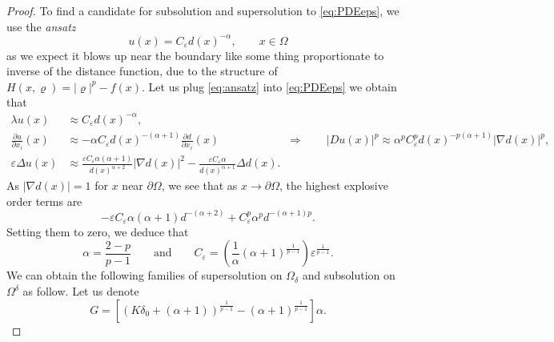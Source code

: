 \documentclass[11pt,reqno]{amsart}
\numberwithin{figure}{section}
\theoremstyle{plain}
\theoremstyle{remark}
\numberwithin{equation}{section}
\begin{document}
\begin{proof} 

\noindent To find a candidate for subsolution and supersolution to \eqref{eq:PDEeps}, we use the \emph{ansatz}
\begin{equation}\label{eq:ansatz}
    u(x) = C_\varepsilon d(x)^{-\alpha}, \qquad x\in \Omega
\end{equation}
as we expect it blows up near the boundary like some thing proportionate to inverse of the distance function, due to the structure of $H(x,\varrho) = |\varrho|^p - f(x)$. Let us plug \eqref{eq:ansatz} into \eqref{eq:PDEeps} we obtain that 
\begin{align*}
    \lambda u(x) &\approx C_\varepsilon d(x)^{-\alpha},\\
    \frac{\partial u}{\partial x_i}(x) &\approx -\alpha C_\varepsilon d(x)^{-(\alpha+1)} \frac{\partial d}{\partial x_i}(x) \qquad\qquad\qquad \Longrightarrow\qquad |Du (x)|^p \approx \alpha^p C_\varepsilon^p d(x)^{-p(\alpha+1)}|\nabla d(x)|^p,\\
    \varepsilon\Delta u(x) &\approx \frac{\varepsilon C_\varepsilon\alpha(\alpha+1)}{d(x)^{\alpha+2}}|\nabla d(x)|^2 - \frac{\varepsilon C_\varepsilon\alpha}{d(x)^{\alpha+1}}\Delta d(x).
\end{align*}
As $|\nabla d(x)| = 1$ for $x$ near $\partial\Omega$, we see that as $x\to \partial \Omega$, the highest explosive order terms are
\begin{equation*}
        -\varepsilon C_\varepsilon \alpha(\alpha+1)d^{-(\alpha+2)} + C_\varepsilon^p \alpha^p d^{-(\alpha+1)p}.
\end{equation*}
Setting them to zero, we deduce that
\begin{equation*}
    \displaystyle\alpha = \frac{2-p}{p-1} \qquad\text{and}\qquad C_\varepsilon = \left(\frac{1}{\alpha}(\alpha+1)^\frac{1}{p-1}\right) \varepsilon^{\frac{1}{p-1}}.
\end{equation*}
We can obtain the following families of supersolution on $\Omega_\delta$ and subsolution on $\Omega^\delta$ as follow. Let us denote
\begin{equation*}
    G = \left[\left(K\delta_0+(\alpha+1)\right)^\frac{1}{p-1} - (\alpha+1)^{\frac{1}{p-1}}\right]\alpha.
\end{equation*}


\end{proof}
\end{document}
